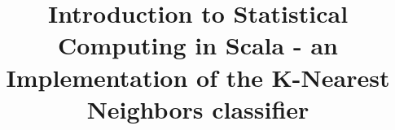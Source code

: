 \documentclass[twoside, 11p]{article}
\begin{document}
\title{Introduction to Statistical Computing in Scala - an Implementation of the K-Nearest Neighbors classifier}

 
\end{document}
